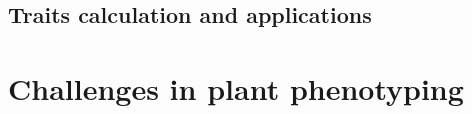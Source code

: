 










\subsection{Traits calculation and applications}











\section{Challenges in plant phenotyping}

